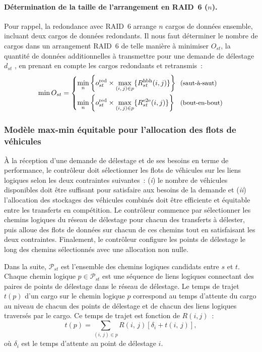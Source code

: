  
\paragraph{Détermination de la taille de l’arrangement en RAID~6 ($n$).} 
Pour rappel, la redondance avec RAID~6 arrange $n$ cargos de données ensemble, incluant deux cargos de données redondants. Il nous faut déterminer le nombre de cargos dans un arrangement RAID~6 de telle manière à minimiser $O_{st}$, la quantité de données additionnelles à transmettre pour une demande de délestage $d_{st}$ , en prenant en compte les cargos redondants et retransmis~: 
\[ 
    \min O_{st}=\begin{dcases} 
    \min_{n} \left\{ o_{st}^{\text{red}} \times \max_{(i,\,j)\in p}\{R_{st}^{\textrm{hbh}}(i,j)\} \right\} & \text{\!\!\small (saut-à-saut)}\\ 
    \min_{n} \left\{ o_{st}^{\text{red}} \times \max_{(i,\,j)\in p}\{R_{st}^{\textrm{e2e}}(i,j)\} \right\} & \text{\!\!\small (bout-en-bout)} 
    \end{dcases} 
\] 
 
 
 
 
\subsubsection{Modèle max-min équitable pour l’allocation des flots de véhicules} 
\label{sec:max-min-allocation-model-fr} 
 
 
À la réception d’une demande de délestage et de ses besoins en terme de performance, le contrôleur doit sélectionner les flots de véhicules sur les liens logiques selon les deux contraintes suivantes~: (\textit{i}) le nombre de véhicules disponibles doit être suffisant pour satisfaire aux besoins de la demande et (\textit{ii}) l’allocation des stockages des véhicules combinés doit être efficiente et équitable entre les transferts en compétition. Le contrôleur commence par sélectionner les chemins logiques du réseau de délestage pour chacun des transferts à délester, puis alloue des flots de données sur chacun de ces chemins tout en satisfaisant les deux contraintes. Finalement, le contrôleur configure les points de délestage le long des chemins sélectionnés avec une allocation non nulle. 
 
 
Dans la suite, $\mathcal{P}_{st}$ est l’ensemble des chemins logiques candidats entre $s$ et $t$. Chaque chemin logique $p\in\mathcal{P}_{st}$ est une séquence de liens logiques connectant des paires de points de délestage dans le réseau de délestage. Le temps de trajet $t(p)$ d’un cargo sur le chemin logique $p$ correspond au temps d’attente du cargo au niveau de chacun des points de délestage et de chacun des liens logiques traversés par le cargo. Ce temps de trajet est fonction de $R(i,j)$~: 
\begin{equation} 
    \label{eq:impl-logical-path-travel-time-fr} 
t\left(p\right) =\sum_{(i,\, j)\in p} R(i,\,j)\left[\delta_{i} + t(i,\,j)\right], 
\end{equation} 
\noindent où $\delta_i$ est le temps d’attente au point de délestage $i$. 
 
